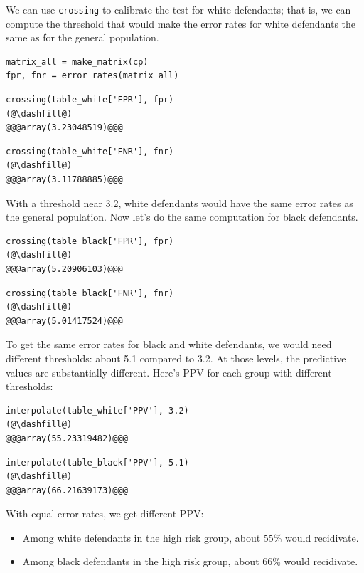 We can use \passthrough{\lstinline!crossing!} to calibrate the test for
white defendants; that is, we can compute the threshold that would make
the error rates for white defendants the same as for the general
population.

\begin{lstlisting}[]
matrix_all = make_matrix(cp)
fpr, fnr = error_rates(matrix_all)
\end{lstlisting}

\begin{lstlisting}[]
crossing(table_white['FPR'], fpr)
(@\dashfill@)
@@@array(3.23048519)@@@
\end{lstlisting}

\begin{lstlisting}[]
crossing(table_white['FNR'], fnr)
(@\dashfill@)
@@@array(3.11788885)@@@
\end{lstlisting}

With a threshold near 3.2, white defendants would have the same error
rates as the general population. Now let's do the same computation for
black defendants.

\begin{lstlisting}[]
crossing(table_black['FPR'], fpr)
(@\dashfill@)
@@@array(5.20906103)@@@
\end{lstlisting}

\begin{lstlisting}[]
crossing(table_black['FNR'], fnr)
(@\dashfill@)
@@@array(5.01417524)@@@
\end{lstlisting}

To get the same error rates for black and white defendants, we would
need different thresholds: about 5.1 compared to 3.2. At those levels,
the predictive values are substantially different. Here's PPV for each
group with different thresholds:

\begin{lstlisting}[]
interpolate(table_white['PPV'], 3.2)
(@\dashfill@)
@@@array(55.23319482)@@@
\end{lstlisting}

\begin{lstlisting}[]
interpolate(table_black['PPV'], 5.1)
(@\dashfill@)
@@@array(66.21639173)@@@
\end{lstlisting}

With equal error rates, we get different PPV:

\begin{itemize}
\item
  Among white defendants in the high risk group, about 55\% would
  recidivate.
\item
  Among black defendants in the high risk group, about 66\% would
  recidivate.
\end{itemize}

